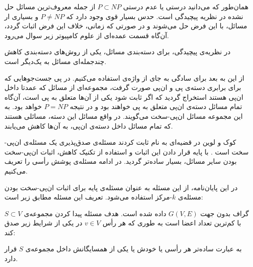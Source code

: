همان‌طور که می‌دانید درستی یا عدم درستی $P \subset NP$ از جمله معروف‌ترین مسائل حل نشده در نظریه پیچیدگی است. حدس بسیار قوی وجود دارد که $P \neq NP$ و بسیاری ار مسائل، با این فرض حل می‌شوند و در صورتی که زمانی، خلاف این فرض اثبات گردد، آن‌گاه قسمت عمده‌ای از علوم کامپیوتر زیر سوال می‌رود.

در نظریه‌ی پیچیدگی، برای دسته‌بندی مسائل، یکی از روش‌های دسته‌بندی کاهش چند‌جمله‌ای مسائل به یک‌دیگر است. 


از این به بعد برای سادگی به جای  از واژه‌ی  استفاده می‌کنیم. در پی جست‌جوهایی که برای برابری دسته‌ی پی و ان‌پی صورت گرفت، مجموعه‌ای از مسائل که عمدتا داخل ان‌پی هستند استخراج گردید که اگر ثابت شود یکی از آن‌ها متعلق به پی است، آن‌گاه تمام مسائل دسته‌ی ان‌پی متعلق به پی خواهند بود و در نتیجه $P = NP$ خواهد بود. به این مجموعه مسائل ان‌پی-سخت می‌گویند. در واقع مسائل این دسته، مسائلی هستند که تمام مسائل داخل دسته‌ی ان‌پی، به آن‌ها کاهش می‌یابند.

کوک و لوین در قضیه‌ای به نام  ثابت کردند مسئله‌ی صدق‌پذیری یک مسئله‌ی ان‌پی-سخت است . با پایه قرار دادن این اثبات و استفاده از تکنیک کاهش، اثبات ان‌پی-سخت بودن سایر مسائل، بسیار ساده‌تر گردید. در ادامه مسئله‌ی پوشش رأسی را تعریف می‌کنیم.

در این پایان‌نامه، از این مسئله به عنوان مسئله‌ی پایه برای اثبات ان‌پی-سخت بودن مسئله‌ی $k$-مرکز استفاده می‌شود. تعریف این مسئله مطابق زیر است:

گراف بدون جهت $G(V, E)$ داده شده است. هدف مسئله پیدا کردن مجموعه‌ی $S \subset V$ با کم‌ترین تعداد اعضا است به طوری که هر رأس $v \in V$ در یکی از شرایط زیر صدق کند:





به عبارت ساده‌تر هر رأسی یا خودش یا یکی از همسایگانش داخل مجموعه‌ی $S$ قرار دارد.

